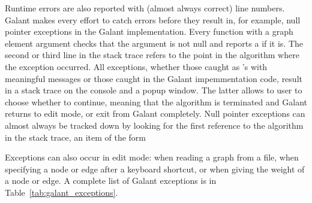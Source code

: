 Runtime errors are also reported with (almost always correct) line
numbers. Galant makes every effort to catch errors before they result in, for
example, null pointer exceptions in the Galant implementation. Every function
with a graph element argument checks that the argument is not null and
reports a  if it is.
The second or third line in the stack trace
refers to the point in the algorithm where the exception occurred.
All exceptions, whether those caught as 's with
meaningful messages or those caught in the Galant impemmentation code, result
in a stack trace on the console and a popup window.
The latter allows to user to choose whether to continue, meaning that the
algorithm is terminated and Galant returns to edit mode, or exit from Galant
completely.
Null pointer exceptions can almost always be tracked down by looking for the
first reference to the algorithm in the stack trace, an item of the form\\
\hspace*{4em}

Exceptions can also occur in edit mode: when reading a graph from a
file, when specifying a node or edge after a keyboard shortcut, or when
giving the weight of a node or edge.
A complete list of Galant exceptions is in Table~\ref{tab:galant_exceptions}.


